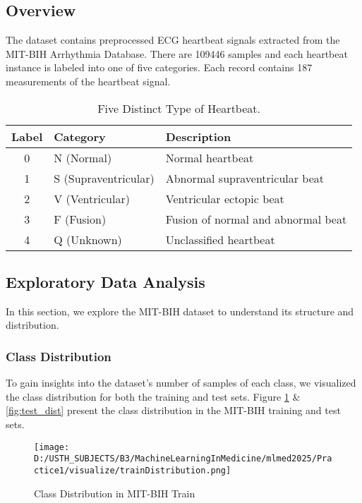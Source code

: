 \documentclass[10pt, conference]{IEEEtran}
\begin{document}
	\subsection{Overview}
	The dataset contains preprocessed ECG heartbeat signals extracted from the MIT-BIH Arrhythmia Database. There are 109446 samples and each heartbeat instance is labeled into one of five categories. Each record contains 187 measurements of the heartbeat signal.
	
	\begin{table}[h]
		\centering
		\begin{tabular}{|c|l|l|}
			\hline
			\textbf{Label} & \textbf{Category} & \textbf{Description} \\ \hline
			0 & N (Normal) & Normal heartbeat \\ \hline
			1 & S (Supraventricular) & Abnormal supraventricular beat \\ \hline
			2 & V (Ventricular) & Ventricular ectopic beat \\ \hline
			3 & F (Fusion) & Fusion of normal and abnormal beat \\ \hline
			4 & Q (Unknown) & Unclassified heartbeat \\ \hline
		\end{tabular}
		\caption{Five Distinct Type of Heartbeat.}
		\label{tab:classes}
	\end{table}
	
	\subsection{Exploratory Data Analysis}
	In this section, we explore the MIT-BIH dataset to understand its structure and distribution.
	
	\subsubsection{Class Distribution}
	To gain insights into the dataset's number of samples of each class, we visualized the class distribution for both the training and test sets. Figure \ref{fig:train_dist} \& \ref{fig:test_dist} present the class distribution in the MIT-BIH training and test sets.
	
	\begin{figure}[H]
		\centering
		\texttt{[image: D:/USTH\_SUBJECTS/B3/MachineLearningInMedicine/mlmed2025/Practice1/visualize/trainDistribution.png]}
		\caption{Class Distribution in MIT-BIH Train}
		\label{fig:train_dist}
	\end{figure}
	
\end{document}
